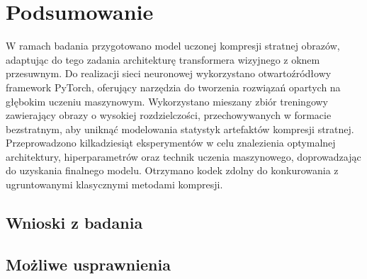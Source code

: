 \section{Podsumowanie}
W ramach badania przygotowano model uczonej kompresji stratnej obrazów, adaptując do tego zadania architekturę transformera wizyjnego z oknem przesuwnym. Do realizacji sieci neuronowej wykorzystano otwartoźródłowy framework PyTorch, oferujący narzędzia do tworzenia rozwiązań opartych na głębokim uczeniu maszynowym. Wykorzystano mieszany zbiór treningowy zawierający obrazy o wysokiej rozdzielczości, przechowywanych w formacie bezstratnym, aby uniknąć modelowania statystyk artefaktów kompresji stratnej. Przeprowadzono kilkadziesiąt eksperymentów w celu znalezienia optymalnej architektury, hiperparametrów oraz technik uczenia maszynowego, doprowadzając do uzyskania finalnego modelu. Otrzymano kodek zdolny do konkurowania z ugruntowanymi klasycznymi metodami kompresji.
\subsection{Wnioski z badania}
\subsection{Możliwe usprawnienia}